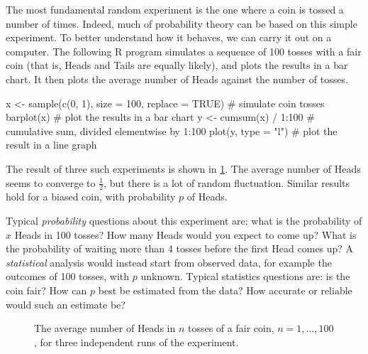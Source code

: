 \begin{example}\label{ex:coin-tossing-simulation}
The most fundamental random experiment is the one where a coin is tossed a number of times. Indeed, much of probability theory can be based on this simple experiment. To better understand how it behaves, we can carry it out on a computer. The following R program simulates a sequence of 100 tosses with a fair coin (that is, Heads and Tails are equally likely), and plots the results in a bar chart. It then plots the average number of Heads against the number of tosses.
\begin{rcode}
x <- sample(c(0, 1), size = 100, replace = TRUE)  # simulate coin tosses
barplot(x)                    # plot the results in a bar chart
y <- cumsum(x) / 1:100        # cumulative sum, divided elementwise by 1:100
plot(y, type = "l")           # plot the result in a line graph
\end{rcode}
The result of three such experiments is shown in \cref{fig:coin-running-average}. The average number of Heads seems to converge to $\tfrac12$, but there is a lot of random fluctuation. Similar results hold for a biased coin, with probability $p$ of Heads.

Typical \emph{probability} questions about this experiment are: what is the probability of $x$ Heads in 100 tosses? How many Heads would you expect to come up? What is the probability of waiting more than 4 tosses before the first Head comes up? A \emph{statistical} analysis would instead start from observed data, for example the outcomes of 100 tosses, with $p$ unknown. Typical statistics questions are: is the coin fair? How can $p$ best be estimated from the data? How accurate or reliable would such an estimate be?
\end{example}

\begin{figure}[ht]
\centering
{}
\caption{The average number of Heads in $n$ tosses of a fair coin, $n = 1, \ldots, 100$, for three independent runs of the experiment.}
\label{fig:coin-running-average}
\end{figure}

